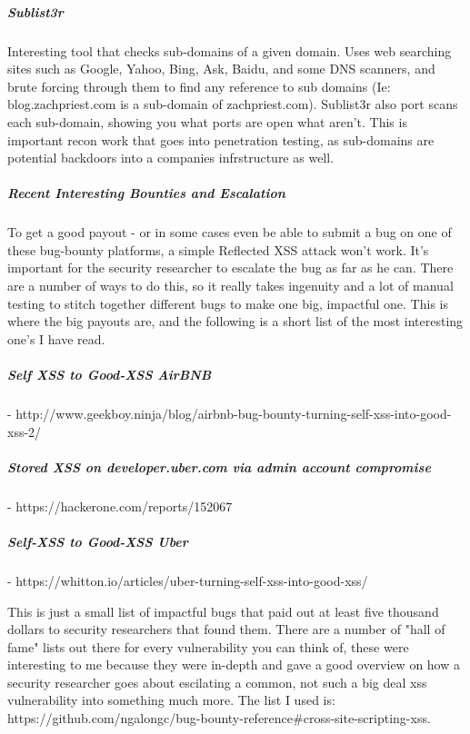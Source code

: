 \subparagraph{Sublist3r}
Interesting tool that checks sub-domains of a given domain. Uses web searching sites such as Google, Yahoo, Bing, Ask, Baidu, and some DNS scanners, and brute forcing through them to find any reference to sub domains (Ie: blog.zachpriest.com is a sub-domain of zachpriest.com).
Sublist3r also port scans each sub-domain, showing you what ports are open what aren’t.  This is important recon work that goes into penetration testing, as sub-domains are potential backdoors into a companies infrstructure as well.

\subparagraph{Recent Interesting Bounties and Escalation }
To get a good payout - or in some cases even be able to submit a bug on one of these bug-bounty platforms, a simple Reflected XSS attack won’t work.  It’s important for the security researcher to escalate the bug as far as he can.  There are a number of ways to do this, so it really takes ingenuity and a lot of manual testing to stitch together different bugs to make one big, impactful one.  This is where the big payouts are, and the following is a short list of the most interesting one’s I have read.

\subparagraph{Self XSS to Good-XSS AirBNB}

- http://www.geekboy.ninja/blog/airbnb-bug-bounty-turning-self-xss-into-good-xss-2/

\subparagraph{Stored XSS on developer.uber.com via admin account compromise}

- https://hackerone.com/reports/152067

\subparagraph{Self-XSS to Good-XSS Uber}

- https://whitton.io/articles/uber-turning-self-xss-into-good-xss/

This is just a small list of impactful bugs that paid out at least five thousand dollars to security researchers that found them.  There are a number of "hall of fame" lists out there for every vulnerability you can think of, these were interesting to me because they were in-depth and gave a good overview on how a security researcher goes about escilating a common, not such a big deal xss vulnerability into something much more.  The list I used is: https://github.com/ngalongc/bug-bounty-reference\#cross-site-scripting-xss.

